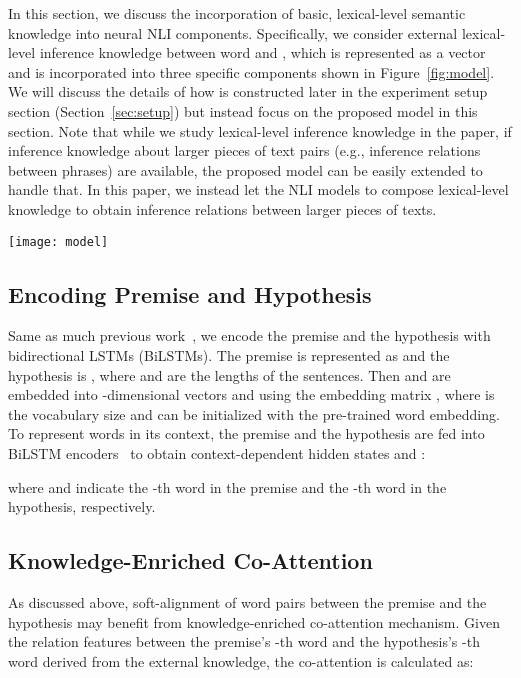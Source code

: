 \documentclass[11pt,a4paper]{article}
\begin{document}
In this section, we discuss the incorporation of basic, lexical-level semantic knowledge into neural NLI components. Specifically, we consider external lexical-level inference knowledge between word  and , which is represented as a vector  and is incorporated into three specific components shown in Figure~\ref{fig:model}. We will discuss the details of how  is constructed later in the experiment setup section (Section~\ref{sec:setup}) but instead focus on the proposed model in this section. Note that while we study lexical-level inference knowledge in the paper, if inference knowledge about larger pieces of text pairs (e.g., inference relations between phrases) are available, the proposed model can be easily extended to handle that. In this paper, we instead let the NLI models to compose lexical-level knowledge to obtain inference relations between larger pieces of texts. 

\begin{figure*}[!htb]
	\centering
	\texttt{[image: model]}
	\caption{A high-level view of neural-network-based NLI models enriched with external knowledge in co-attention, local inference collection, and inference composition.}
	\label{fig:model}
\end{figure*}

\subsection{Encoding Premise and Hypothesis}

Same as much previous work~\citep{DBLP:conf/acl/ChenZLWJI17,DBLP:conf/repeval/ChenZLWJI17}, we encode the premise and the hypothesis with bidirectional LSTMs (BiLSTMs). The premise is represented as   and the hypothesis is , where  and  are the lengths of the sentences. Then  and  are embedded into -dimensional vectors  and  using the embedding matrix , where  is the vocabulary size and  can be initialized with the pre-trained word embedding. To represent words in its context, the premise and the hypothesis are fed into BiLSTM encoders~\citep{DBLP:journals/neco/HochreiterS97} to obtain context-dependent hidden states  and : 

where  and  indicate the -th word in the premise and the -th word in the hypothesis, respectively.

\subsection{Knowledge-Enriched Co-Attention}
As discussed above, soft-alignment of word pairs between the premise and the hypothesis may benefit from knowledge-enriched co-attention mechanism. Given the relation features  between the premise's -th word and the hypothesis's -th word derived from the external knowledge, the co-attention is calculated as:
\end{document}
